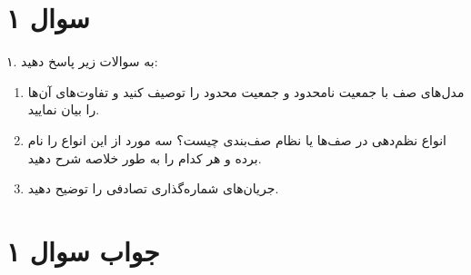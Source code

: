 \section*{سوال ۱}

۱. به سوالات زیر پاسخ دهید:

\begin{enumerate}
	\item مدل‌های صف با جمعیت نامحدود  و جمعیت محدود  را توصیف کنید و تفاوت‌های آن‌ها را بیان نمایید.
	\item انواع نظم‌دهی در صف‌ها یا نظام صف‌بندی  چیست؟ سه مورد از این انواع را نام برده و هر کدام را به طور خلاصه شرح دهید.
	\item جریان‌های شماره‌گذاری تصادفی  را توضیح دهید.
\end{enumerate}

\section*{جواب سوال ۱}